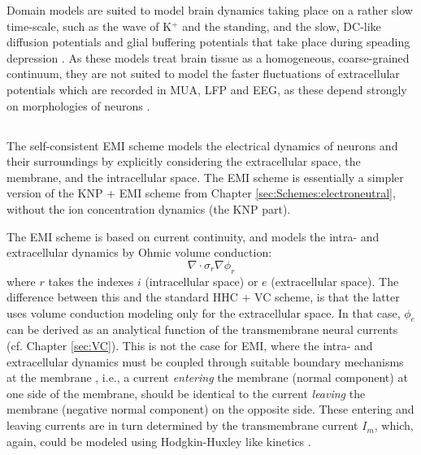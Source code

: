 Domain models are suited to model brain dynamics taking place on a rather slow time-scale, such as the wave of K$^+$ and the standing, and the slow, DC-like diffusion potentials and glial buffering potentials that take place during speading depression \cite{Mori2015, OConnell2016, tuttle2019}. As these models treat brain tissue as a homogeneous, coarse-grained continuum, they are not suited to model the faster fluctuations of extracellular potentials which are recorded in MUA, LFP and EEG, as these depend strongly on morphologies of neurons \cite{Einevoll2013}. 




\subsection{}
The self-consistent EMI scheme models the electrical dynamics of neurons and their surroundings by explicitly considering the extracellular space, the membrane, and the intracellular space. The EMI scheme is essentially a simpler version of the KNP + EMI scheme from Chapter \ref{sec:Schemes:electroneutral}, without the ion concentration dynamics (the KNP part). 

The EMI scheme is based on current continuity, and models the intra- and extracellular dynamics by Ohmic volume conduction:
\begin{equation}
\nabla \cdot \sigma_r \nabla \phi_r
\end{equation}
where $r$ takes the indexes $i$ (intracellular space) or $e$ (extracellular space). The difference between this and the standard HHC + VC scheme, is that the latter uses volume conduction modeling only for the extracellular space. In that case, $\phi_e$ can be derived as an analytical function of the transmembrane neural currents (cf. Chapter \ref{sec:VC}). This is not the case for EMI, where the intra- and extracellular dynamics must be coupled through suitable boundary mechanisms at the membrane \cite{Agudelo-Toro2013, Tveito2019}, i.e., a current \textit{entering} the membrane (normal component) at one side of the membrane, should be identical to the current \textit{leaving} the membrane (negative normal component) on the opposite side. These entering and leaving currents are in turn determined by the transmembrane current $I_m$, which, again, could be modeled using Hodgkin-Huxley like kinetics \cite{Agudelo-Toro2013, Tveito2019}. 

